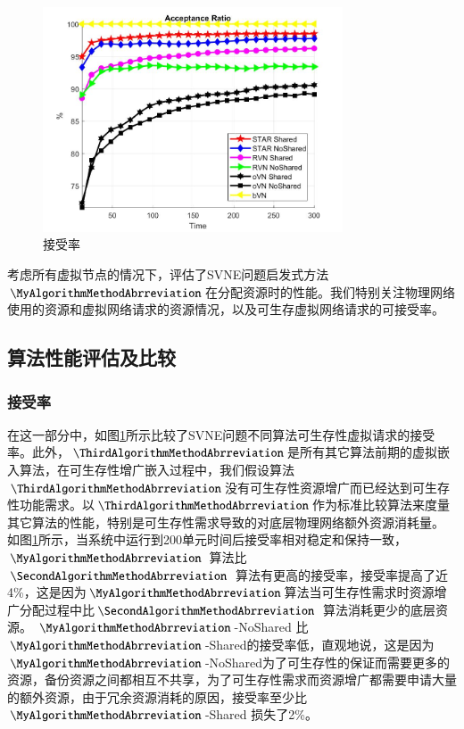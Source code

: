 \begin{figure}[htbp]
\centering
\centering
\includegraphics[width=3.5in]{figures/AcceptionRatio}
\caption{接受率}\label{fig:AcceptionRatio}
\end{figure}

考虑所有虚拟节点的情况下，评估了SVNE问题启发式方法$\MyAlgorithmMethodAbrreviation$在分配资源时的性能。我们特别关注物理网络使用的资源和虚拟网络请求的资源情况，以及可生存虚拟网络请求的可接受率。
\subsection{算法性能评估及比较}
\subsubsection{接受率}
在这一部分中，如图\ref{fig:AcceptionRatio}所示比较了SVNE问题不同算法可生存性虚拟请求的接受率。此外，$\ThirdAlgorithmMethodAbrreviation$是所有其它算法前期的虚拟嵌入算法，在可生存性增广嵌入过程中，我们假设算法$\ThirdAlgorithmMethodAbrreviation$没有可生存性资源增广而已经达到可生存性功能需求。以$\ThirdAlgorithmMethodAbrreviation$作为标准比较算法来度量其它算法的性能，特别是可生存性需求导致的对底层物理网络额外资源消耗量。
如图\ref{fig:AcceptionRatio}所示，当系统中运行到200单元时间后接受率相对稳定和保持一致，$\MyAlgorithmMethodAbrreviation$ 算法比$\SecondAlgorithmMethodAbrreviation$ 算法有更高的接受率，接受率提高了近4\%，这是因为$\MyAlgorithmMethodAbrreviation$算法当可生存性需求时资源增广分配过程中比$\SecondAlgorithmMethodAbrreviation$ 算法消耗更少的底层资源。 $\MyAlgorithmMethodAbrreviation$-NoShared 比$\MyAlgorithmMethodAbrreviation$-Shared的接受率低，直观地说，这是因为$\MyAlgorithmMethodAbrreviation$-NoShared为了可生存性的保证而需要更多的资源，备份资源之间都相互不共享，为了可生存性需求而资源增广都需要申请大量的额外资源，由于冗余资源消耗的原因，接受率至少比$\MyAlgorithmMethodAbrreviation$-Shared 损失了2\%。

